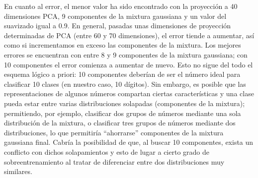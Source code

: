 \documentclass[a4paper]{article}
\begin{document}
\quad En cuanto al error, el menor valor ha sido encontrado con la proyección a 40 dimensiones PCA, 9 componentes de la mixtura gaussiana y un valor del suavizado igual a 0.9. En general, pasadas unas dimensiones de proyección determinadas de PCA (entre 60 y 70 dimensiones), el error tiende a aumentar, así como si incrementamos en exceso las componentes de la mixtura. Los mejores errores se encuentran con entre 8 y 9 componentes de la mixtura gaussiana; con 10 componentes el error comienza a aumentar de nuevo. Esto no sigue del todo el esquema lógico a priori: 10 componentes deberían de ser el número ideal para clasificar 10 clases (en nuestro caso, 10 dígitos). Sin embargo, es posible que las representaciones de algunos números compartan ciertas características y una clase pueda estar entre varias distribuciones solapadas (componentes de la mixtura); permitiendo, por ejemplo, clasificar dos grupos de números mediante una sola distribución de la mixtura, o clasificar tres grupos de números mediante dos distribuciones, lo que permitiría “ahorrarse” componentes de la mixtura gaussiana final. Cabría la posibilidad de que, al buscar 10 componentes, exista un conflicto con dichos solapamientos y esto de lugar a cierto grado de sobreentrenamiento al tratar de diferenciar entre dos distribuciones muy similares.
\end{document}
